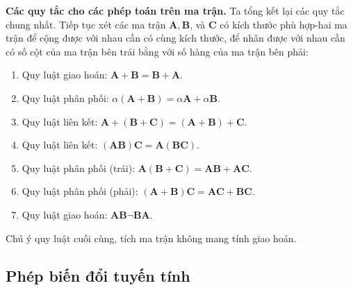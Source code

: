 \textbf{Các quy tắc cho các phép toán trên ma trận.} Ta tổng kết lại các quy tắc chung nhất.
Tiếp tục xét các ma trận \(\mathbf{A},\mathbf{B}\), và \(\mathbf{C}\) có kích thước phù hợp-hai ma trận để cộng được với nhau cần có cùng kích thước, để nhân được với nhau cần có số cột của ma trận bên trái bằng với số hàng của ma trận bên phải:
\begin{enumerate}[label=(\alph*)]
    \item Quy luật giao hoán: \(\mathbf{A}+\mathbf{B}=\mathbf{B}+\mathbf{A}.\)
    \item Quy luật phân phối: \(\alpha(\mathbf{A}+\mathbf{B})=\alpha\mathbf{A}+\alpha\mathbf{B}.\)
    \item Quy luật liên kết: \(\mathbf{A}+(\mathbf{B}+\mathbf{C})=(\mathbf{A}+\mathbf{B})+\mathbf{C}.\)
    \item Quy luật liên kết: \((\mathbf{AB})\mathbf{C}=\mathbf{A}(\mathbf{BC}).\)
    \item Quy luật phân phối (trái): \(\mathbf{A}(\mathbf{B}+\mathbf{C})=\mathbf{AB}+\mathbf{AC}.\)
    \item Quy luật phân phối (phải): \((\mathbf{A}+\mathbf{B})\mathbf{C}=\mathbf{AC}+\mathbf{BC}.\)
    \item Quy luật giao hoán: \(\mathbf{AB}\neg\mathbf{BA}\).
\end{enumerate}
Chú ý quy luật cuối cùng, tích ma trận không mang tính giao hoán.


\subsection{Phép biến đổi tuyến tính}

